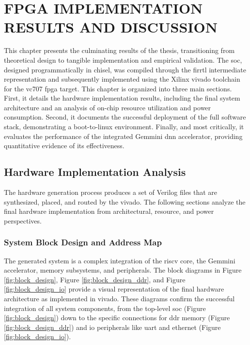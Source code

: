 
\chapter{FPGA IMPLEMENTATION RESULTS AND DISCUSSION}
\label{chap:fpga_results}

This chapter presents the culminating results of the thesis, transitioning from theoretical design to tangible implementation and empirical validation. The \acrfull{soc}, designed programmatically in \acrshort{chisel}, was compiled through the \acrshort{firrtl} intermediate representation and subsequently implemented using the Xilinx \acrshort{vivado} toolchain for the \acrshort{vc707} \acrshort{fpga} target. This chapter is organized into three main sections. First, it details the hardware implementation results, including the final system architecture and an analysis of on-chip resource utilization and power consumption. Second, it documents the successful deployment of the full software stack, demonstrating a boot-to-\acrshort{linux} environment. Finally, and most critically, it evaluates the performance of the integrated Gemmini \acrshort{dnn} accelerator, providing quantitative evidence of its effectiveness.

\section{Hardware Implementation Analysis}
\label{sec:hardware_results}

The hardware generation process produces a set of Verilog files that are synthesized, placed, and routed by the \acrlong{vivado}. The following sections analyze the final hardware implementation from architectural, resource, and power perspectives.

\subsection{System Block Design and Address Map}

The generated system is a complex integration of the \acrshort{riscv} core, the Gemmini accelerator, memory subsystems, and peripherals. The block diagrams in Figure \ref{fig:block_design}, Figure \ref{fig:block_design_ddr}, and Figure \ref{fig:block_design_io} provide a visual representation of the final hardware architecture as implemented in \acrshort{vivado}. These diagrams confirm the successful integration of all system components, from the top-level \acrshort{soc} (Figure \ref{fig:block_design}) down to the specific connections for \acrshort{ddr} memory (Figure \ref{fig:block_design_ddr}) and \acrshort{io} peripherals like \acrshort{uart} and \acrshort{ethernet} (Figure \ref{fig:block_design_io}).

